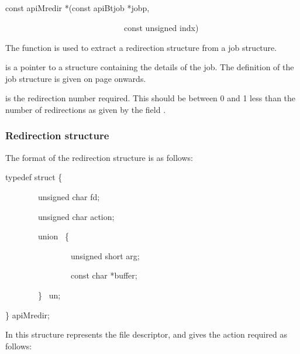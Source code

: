 \subsection{\funcnameXBgetredir{}}

\begin{expara}

const apiMredir *\funcnameXBgetredir{}(const apiBtjob *jobp,

\ \ \ \ \ \ \ \ \ \ \ \ \ \ \ \ \ \ \ \ \ \ \ \ \ \ \ \ \ const unsigned
indx)

\end{expara}

The function \funcXBgetredir{} is used to extract a
redirection structure from a job structure.

 is a pointer to a structure containing the
details of the job. The definition of the job structure is given on
page \pageref{bkm:Jobstructure} onwards.

 is the redirection number required. This
should be between 0 and 1 less than the number of redirections as given
by the field .

\subsubsection{Redirection structure}
\label{bkm:redirstruct}The format of the redirection structure is as
follows:

\begin{expara}

typedef struct \{

\ \ \ \ \ \ \ \ unsigned char fd;

\ \ \ \ \ \ \ \ unsigned char action;

\ \ \ \ \ \ \ \ union \ \{

\ \ \ \ \ \ \ \ \ \ \ \ \ \ \ \ unsigned short arg;

\ \ \ \ \ \ \ \ \ \ \ \ \ \ \ \ const char *buffer;

\ \ \ \ \ \ \ \ \} \ un;

\} apiMredir;

\end{expara}

In this structure  represents the file
descriptor, and  gives the action required
as follows:

